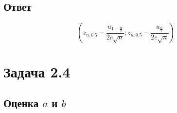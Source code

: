\subsection*{Ответ}
\begin{equation}
    \left ( z_{n,0.5} - \frac{u_{1 - \frac{\alpha}{2}}}{2 c \sqrt{n}} ; z_{n,0.5} - \frac{u_{\frac{\alpha}{2}}}{2 c \sqrt{n}} \right )
\end{equation}

\section*{Задача 2.4}

\subsection*{Оценка $a$ и $b$}

